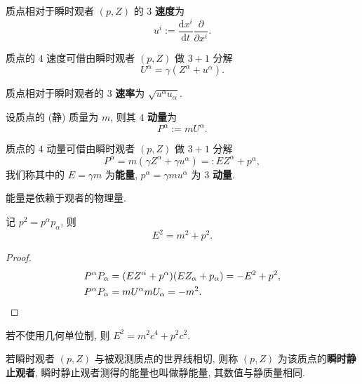 \begin{definition}[$ 3 $ 速度]
    质点相对于瞬时观者 $ (p,Z) $ 的 $ 3 $ {\bf 速度}为
    \[ u^{i}:=\frac{\mathrm{d}x^i}{\mathrm{d}t}\frac{\partial}{\partial x^{i}}. \]
\end{definition}
\begin{proposition}
    质点的 $ 4 $ 速度可借由瞬时观者 $ (p,Z) $ 做 $ 3+1 $ 分解
    \[ U^{\alpha}=\gamma(Z^{\alpha}+u^{\alpha}). \]
\end{proposition}
\begin{definition}[$ 3 $ 速率]
    质点相对于瞬时观者的 $ 3 $ {\bf 速率}为 $ \sqrt{u^{\alpha}u_{\alpha}}$.
\end{definition}

\begin{definition}[$ 4 $ 动量]
    设质点的 (静) 质量为 $ m $, 则其 $ 4 $ {\bf 动量}为
    \[ P^\alpha:=mU^\alpha. \]
\end{definition}

\begin{definition}[能量与 $ 3 $ 动量]
    质点的 $ 4 $ 动量可借由瞬时观者 $ (p,Z) $ 做 $ 3+1 $ 分解
    \[ P^{\alpha}=m(\gamma Z^{\alpha}+\gamma u^{\alpha})=:EZ^{\alpha}+p^{\alpha}, \]
    我们称其中的 $ E=\gamma m $ 为{\bf 能量}, $ p^{\alpha}=\gamma m u^{\alpha} $ 为 $ 3 $ {\bf 动量}.
\end{definition}

\begin{remark}
    能量是依赖于观者的物理量.
\end{remark}

\begin{proposition}[质能方程]
    记 $ p^2=p^\alpha p_\alpha $, 则
    \[ E^2=m^2+p^2. \]
\end{proposition}
\begin{proof}\keepline
    \begin{align*}
    P^\alpha P_\alpha&=(EZ^\alpha+p^\alpha)(EZ_\alpha+p_\alpha)=-E^2+p^2,\\
        P^\alpha P_\alpha&=mU^\alpha mU_\alpha=-m^2.\qedhere
    \end{align*}
\end{proof}

\begin{remark}
    若不使用几何单位制, 则 $ E^2=m^2c^4+p^2c^2 $. 
\end{remark}

若瞬时观者 $ (p,Z) $ 与被观测质点的世界线相切, 则称 $ (p,Z) $ 为该质点的{\bf 瞬时静止观者}, 瞬时静止观者测得的能量也叫做静能量, 其数值与静质量相同.

